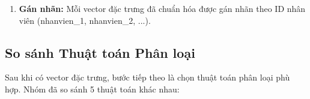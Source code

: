 \documentclass[a4paper]{book}
\begin{document}
\begin{enumerate}
\begin{itemize}
        \item \textbf{Cosine Similarity yêu cầu:} Thuật toán Cosine chỉ quan tâm đến \textit{hướng} của vector, không quan tâm độ dài. Chuẩn hóa L2 giúp tất cả vector có độ dài = 1, biến khoảng cách Euclid tương đương với Cosine distance.
    \end{itemize}
    
    \textbf{Công thức và cách hoạt động:}
    \[
    v_{\text{norm}} = \frac{v}{\|v\|_2} = \frac{v}{\sqrt{\sum_{i=1}^{1280} v_i^2}}
    \]
    
    \textbf{Ví dụ minh họa:}
    
    Giả sử vector gốc: $v = [3, 4, 0, 0, \ldots, 0]$ (1280 chiều, phần lớn = 0)
    
    \begin{enumerate}
        \item Tính norm L2: $\|v\|_2 = \sqrt{3^2 + 4^2} = \sqrt{9 + 16} = 5$
        \item Chia từng phần tử cho norm: $v_{\text{norm}} = \left[\frac{3}{5}, \frac{4}{5}, 0, \ldots, 0\right] = [0.6, 0.8, 0, \ldots, 0]$
        \item Kiểm tra: $\|v_{\text{norm}}\|_2 = \sqrt{0.6^2 + 0.8^2} = \sqrt{0.36 + 0.64} = 1$
    \end{enumerate}
    
    \textbf{Lợi ích sau khi chuẩn hóa:}
    
    \begin{itemize}
        \item \textbf{Tất cả vector có cùng độ dài = 1:} Loại bỏ ảnh hưởng của độ sáng, chỉ so sánh "hướng" (nội dung khuôn mặt).
        
        \item \textbf{Khoảng cách có ý nghĩa hơn:} Với hai vector chuẩn hóa $a$ và $b$:
        \[
        \|a - b\|_2^2 = 2(1 - a \cdot b) = 2(1 - \cos(\theta))
        \]
        Tức là khoảng cách Euclid tỷ lệ thuận với góc giữa hai vector.
        
        \item \textbf{Hội tụ nhanh hơn:} SVM và các thuật toán gradient-based hoạt động ổn định hơn khi dữ liệu có cùng scale.
    \end{itemize}
    
    \item \textbf{Gán nhãn:} Mỗi vector đặc trưng đã chuẩn hóa được gán nhãn theo ID nhân viên (nhanvien\_1, nhanvien\_2, ...).
\end{enumerate}

\subsection{So sánh Thuật toán Phân loại}
Sau khi có vector đặc trưng, bước tiếp theo là chọn thuật toán phân loại phù hợp. Nhóm đã so sánh 5 thuật toán khác nhau:
\end{document}
